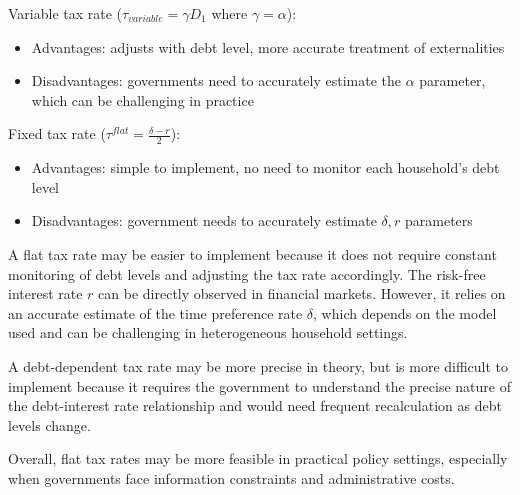 \documentclass[a4paper,12pt]{article} %
\theoremstyle{nonitalic}
\begin{document}
Variable tax rate ($\tau_{variable} = \gamma D_1$ where $\gamma = \alpha$):
\begin{itemize}
    \item Advantages: adjusts with debt level, more accurate treatment of externalities
    \item Disadvantages: governments need to accurately estimate the $\alpha$ parameter, which can be challenging in practice
\end{itemize}

Fixed tax rate ($\tau^{flat} = \frac{\delta - r}{2}$):

\begin{itemize}
    \item Advantages: simple to implement, no need to monitor each household's debt level 
    \item Disadvantages: government needs to accurately estimate $\delta, r$ parameters
\end{itemize}

A flat tax rate may be easier to implement because 
it does not require constant monitoring of debt levels 
and adjusting the tax rate accordingly. 
The risk-free interest rate $r$ can be directly observed in financial markets.
However, it relies on an accurate estimate of the time preference rate $\delta$, 
which depends on the model used and can be challenging in heterogeneous household settings.

A debt-dependent tax rate may be more precise in theory, 
but is more difficult to implement because it requires the government to understand 
the precise nature of the debt-interest rate relationship
and would need frequent recalculation as debt levels change.

Overall, flat tax rates may be more feasible in practical policy settings, 
especially when governments face information constraints and administrative costs.
\end{document}
